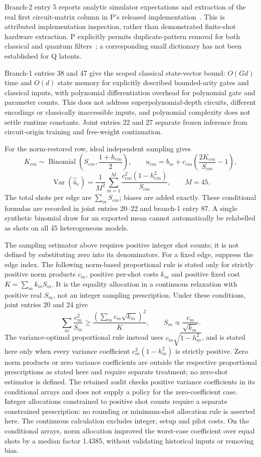 \documentclass{article}
\begin{document}
Branch-2 entry 5 reports analytic simulator expectations and extraction of the real first circuit-matrix column in P's released implementation~\cite{Player,Pextract}. This is attributed implementation inspection, rather than demonstrated finite-shot hardware extraction. P explicitly permits duplicate-pattern removal for both classical and quantum filters~\cite{P}; a corresponding small dictionary has not been established for Q latents.

Branch-1 entries 38 and 47 give the scoped classical state-vector bound: \(O(Gd)\) time and \(O(d)\) state memory for explicitly described bounded-arity gates and classical inputs, with polynomial differentiation overhead for polynomial gate and parameter counts. This does not address superpolynomial-depth circuits, different encodings or classically inaccessible inputs, and polynomial complexity does not settle runtime constants. Joint entries 22 and 27 separate frozen inference from circuit-origin training and free-weight continuation.

For the norm-restored row, ideal independent sampling gives
\[
K_{em}\sim\operatorname{Binomial}\left(S_{em},\frac{1+h_{em}}{2}\right),
\qquad
\widehat u_{em}=b_m+c_{em}\left(\frac{2K_{em}}{S_{em}}-1\right),
\]
\[
\operatorname{Var}(\widehat{\bar u}_e)
=\frac{1}{M^2}\sum_{m=1}^{M}
\frac{c_{em}^2(1-h_{em}^2)}{S_{em}},\qquad M=45.
\]
The total shots per edge are \(\sum_mS_{em}\); biases are added exactly. These conditional formulas are recorded in joint entries 20--22 and branch-1 entry 87. A single synthetic binomial draw for an exported mean cannot automatically be relabelled as shots on all 45 heterogeneous models.

The sampling estimator above requires positive integer shot counts; it is not defined by substituting zero into its denominators. For a fixed edge, suppress the edge index. The following norm-based proportional rule is stated only for strictly positive norm products \(c_m\), positive per-shot costs \(k_m\) and positive fixed cost \(K=\sum_m k_mS_m\). It is the equality allocation in a continuous relaxation with positive real \(S_m\), not an integer sampling prescription. Under these conditions, joint entries 20 and 24 give
\[
\sum_m\frac{c_m^2}{S_m}\geq
\frac{\left(\sum_m c_m\sqrt{k_m}\right)^2}{K},
\qquad S_m\propto\frac{c_m}{\sqrt{k_m}}.
\]
The variance-optimal proportional rule instead uses \(c_m\sqrt{1-h_m^2}\), and is stated here only when every variance coefficient \(c_m^2(1-h_m^2)\) is strictly positive. Zero norm products or zero variance coefficients are outside the respective proportional prescriptions as stated here and require separate treatment; no zero-shot estimator is defined. The retained audit checks positive variance coefficients in its conditional arrays and does not supply a policy for the zero-coefficient case. Integer allocations constrained to positive shot counts require a separate constrained prescription: no rounding or minimum-shot allocation rule is asserted here. The continuous calculation excludes integer, setup and pilot costs. On the conditional arrays, norm allocation improved the worst-case coefficient over equal shots by a median factor 1.4385, without validating historical inputs or removing bias.
\end{document}
